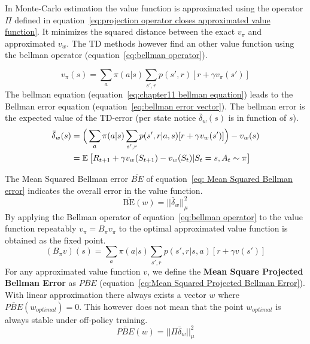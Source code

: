 In Monte-Carlo estimation the value function is approximated using the operator $\Pi$ defined in equation~\ref{eq:projection operator closes approximated value function}. It minimizes the squared distance between the exact $v_\pi$ and approximated $v_w$. The TD methods however find an other value function using the bellman operator (equation~\ref{eq:bellman operator}).

\begin{equation}
v_\pi(s) = \sum_a \pi(a|s) \sum_{s',r}p(s', r)[r+\gamma v_{\pi}(s')]
\label{eq:chapter11 bellman equation}
\end{equation}
The bellman equation (equation~\ref{eq:chapter11 bellman equation}) leads to the Bellman error equation (equation~\ref{eq:bellman error vector}). The bellman error is the expected value of the TD-error (per state notice $\bar{\delta}_w(s)$ is in function of $s$).
\begin{equation}
\begin{split}
\bar{\delta}_w(s) & = \Big( \sum_a \pi(a|s) \sum_{s', r} p(s', r | a, s)[r+\gamma v_w(s')] \Big) - v_w(s) \\
& = \operatorname{\mathbb{E}}\big[ R_{t+1} + \gamma v_w(S_{t+1}) - v_w(S_t) | S_t = s, A_t \sim \pi \big]\\
\end{split}
\label{eq:bellman error vector}
\end{equation}

The Mean Squared Bellman error $\overline{BE}$ of equation~\ref{eq: Mean Squared Bellman error} indicates the overall error in the value function.
\begin{equation}
\overline{\text{BE}}(w) = || \bar{\delta}_w ||^2_\mu
\label{eq: Mean Squared Bellman error}
\end{equation}
By applying the Bellman operator of equation~\ref{eq:bellman operator} to the value function repeatably $v_\pi = B_\pi v_\pi$ to the optimal approximated value function is obtained as the fixed point.
\begin{equation}
(B_\pi v)(s) = \sum_a \pi(a|s) \sum_{s', r} p(s', r | s, a)[r+\gamma v(s')]
\label{eq:bellman operator}
\end{equation}
For any approximated value function $v$, we define the \textbf{Mean Square Projected Bellman Error} as $\overline{PBE}$ (equation~\ref{eq:Mean Squared Projected Bellman Error}). With linear approximation there always exists a vector $w$ where $\overline{PBE}(w_{optimal})=0$. This however does not mean that the point $w_{optimal}$ is always stable under off-policy training.
\begin{equation}
\overline{PBE}(w) = || \Pi\bar{\delta}_w||^2_\mu
\label{eq:Mean Squared Projected Bellman Error}
\end{equation}

